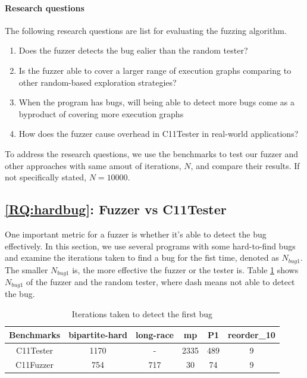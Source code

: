\paragraph*{Research questions} The following research questions are list for evaluating the fuzzing algorithm.
\begin{enumerate}[label=RQ\arabic*]
	\item Does the fuzzer detects the bug ealier than the random tester? \label{RQ:hardbug}
	\item Is the fuzzer able to cover a larger range of execution graphs comparing to other random-based exploration strategies? \label{RQ:coverage}
	\item When the program has bugs, will being able to detect more bugs come as a byproduct of covering more execution graphs \label{RQ:bug}
	\item How does the fuzzer cause overhead in C11Tester in real-world applications? \label{RQ:overhead}
\end{enumerate}

To address the research questions, we use the benchmarks to test our fuzzer and other approaches with same amout of iterations, $N$, and compare their results. If not specifically stated, $N = 10000$.

\subsection{\ref*{RQ:hardbug}: Fuzzer vs C11Tester}

One important metric for a fuzzer is whether it's able to detect the bug effectively. In this section, we use several programs with some hard-to-find bugs and examine the iterations taken to find a bug for the fist time, denoted as $N_{bug1}$. The smaller $N_{bug1}$ is, the more effective the fuzzer or the tester is. Table \ref{c11fuzzer-hardbug} shows $N_{bug1}$ of the fuzzer and the random tester, where dash means not able to detect the bug.

\begin{table}[h!]
	\centering
	\begin{tabular}{ |c|ccccc| }
		\hline
		Benchmarks & bipartite-hard & long-race & mp & P1  & reorder\_10 \\
		\hline
		C11Tester  & 1170           & -         & 2335  & 489 & 9           \\
		C11Fuzzer  & 754            & 717       & 30 & 74  & 9           \\
		\hline
	\end{tabular}
	\caption{Iterations taken to detect the first bug}
	\label{c11fuzzer-hardbug}
\end{table}


